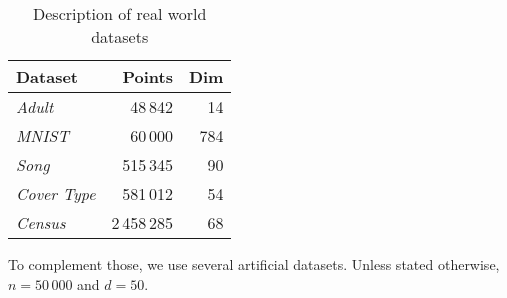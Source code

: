 \begin{table}[htbp]
    \centering
    \begin{tabular}{lrr}
        Dataset & Points & Dim \\
        \hline
        \emph{Adult} & 48\,842 & 14 \\
        \emph{MNIST} & 60\,000 & 784 \\
        \emph{Song} & 515\,345 & 90 \\
        \emph{Cover Type} & 581\,012 & 54 \\
        \emph{Census} & 2\,458\,285 & 68
    \end{tabular}
    \caption{Description of real world datasets}
        \label{tbl:datasets}
\end{table}

To complement those, we use several artificial datasets. Unless stated otherwise, $n = 50\,000$ and $d=50$.
